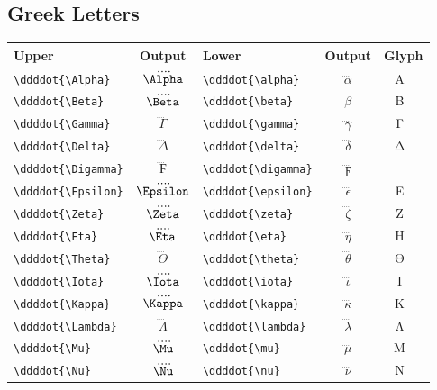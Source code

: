 \documentclass[12pt,a4paper]{article}
\begin{document}
\subsection*{Greek Letters}
\begin{longtable}{|l|c|l|c|c|}
\hline
\textbf{Upper}              & \textbf{Output}     & \textbf{Lower}              & \textbf{Output}        & \textbf{Glyph} \\
\hline
\verb|\ddddot{\Alpha}|      & $\ddddot{\Alpha}$   & \verb|\ddddot{\alpha}|      & $\ddddot{\alpha}$      & Α⃜ α⃜ \\
\verb|\ddddot{\Beta}|       & $\ddddot{\Beta}$    & \verb|\ddddot{\beta}|       & $\ddddot{\beta}$       & Β⃜ β⃜ \\
\verb|\ddddot{\Gamma}|      & $\ddddot{\Gamma}$   & \verb|\ddddot{\gamma}|      & $\ddddot{\gamma}$      & Γ⃜ γ⃜ \\
\verb|\ddddot{\Delta}|      & $\ddddot{\Delta}$   & \verb|\ddddot{\delta}|      & $\ddddot{\delta}$      & Δ⃜ δ⃜ \\
\verb|\ddddot{\Digamma}|    & $\ddddot{\Digamma}$ & \verb|\ddddot{\digamma}|    & $\ddddot{\digamma}$    & Ϝ⃜ ϝ⃜ \\
\verb|\ddddot{\Epsilon}|    & $\ddddot{\Epsilon}$ & \verb|\ddddot{\epsilon}|    & $\ddddot{\epsilon}$    & Ε⃜ ϵ⃜ \\
\verb|\ddddot{\Zeta}|       & $\ddddot{\Zeta}$    & \verb|\ddddot{\zeta}|       & $\ddddot{\zeta}$       & Ζ⃜ ζ⃜ \\
\verb|\ddddot{\Eta}|        & $\ddddot{\Eta}$     & \verb|\ddddot{\eta}|        & $\ddddot{\eta}$        & Η⃜ η⃜ \\
\verb|\ddddot{\Theta}|      & $\ddddot{\Theta}$   & \verb|\ddddot{\theta}|      & $\ddddot{\theta}$      & Θ⃜ θ⃜ \\
\verb|\ddddot{\Iota}|       & $\ddddot{\Iota}$    & \verb|\ddddot{\iota}|       & $\ddddot{\iota}$       & Ι⃜ ι⃜ \\
\verb|\ddddot{\Kappa}|      & $\ddddot{\Kappa}$   & \verb|\ddddot{\kappa}|      & $\ddddot{\kappa}$      & Κ⃜ κ⃜ \\
\verb|\ddddot{\Lambda}|     & $\ddddot{\Lambda}$  & \verb|\ddddot{\lambda}|     & $\ddddot{\lambda}$     & Λ⃜ λ⃜ \\
\verb|\ddddot{\Mu}|         & $\ddddot{\Mu}$      & \verb|\ddddot{\mu}|         & $\ddddot{\mu}$         & Μ⃜ μ⃜ \\
\verb|\ddddot{\Nu}|         & $\ddddot{\Nu}$      & \verb|\ddddot{\nu}|         & $\ddddot{\nu}$         & Ν⃜ ν⃜ \\

\end{longtable}
\end{document}
